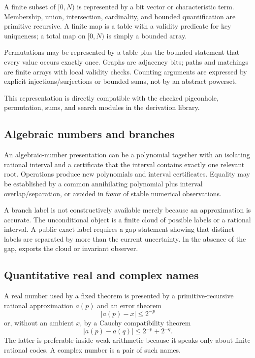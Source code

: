A finite subset of \([0,N)\) is represented by a bit vector or characteristic term.  Membership,
union, intersection, cardinality, and bounded quantification are primitive recursive.  A finite map
is a table with a validity predicate for key uniqueness; a total map on \([0,N)\) is simply a bounded
array.

Permutations may be represented by a table plus the bounded statement that every value occurs
exactly once.  Graphs are adjacency bits; paths and matchings are finite arrays with local validity
checks.  Counting arguments are expressed by explicit injections/surjections or bounded sums, not by
an abstract powerset.

This representation is directly compatible with the checked pigeonhole, permutation, sums, and
search modules in the derivation library.

\subsection{Algebraic numbers and branches}

An algebraic-number presentation can be a polynomial together with an isolating rational interval
and a certificate that the interval contains exactly one relevant root.  Operations produce new
polynomials and interval certificates.  Equality may be established by a common annihilating
polynomial plus interval overlap/separation, or avoided in favor of stable numerical observations.

A branch label is not constructively available merely because an approximation is accurate.  The
unconditional object is a finite cloud of possible labels or a rational interval.  A public exact
label requires a gap statement showing that distinct labels are separated by more than the current
uncertainty.  In the absence of the gap, \TAPIR{} exports the cloud or invariant observer.

\subsection{Quantitative real and complex names}

A real number used by a fixed theorem is presented by a primitive-recursive rational approximation
\(a(p)\) and an error theorem
\[
  |a(p)-x|\le 2^{-p}
\]
or, without an ambient \(x\), by a Cauchy compatibility theorem
\[
  |a(p)-a(q)|\le 2^{-p}+2^{-q}.
\]
The latter is preferable inside weak arithmetic because it speaks only about finite rational codes.
A complex number is a pair of such names.


